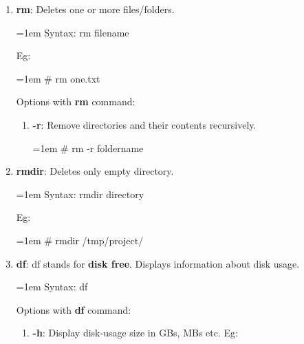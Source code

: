 \begin{flushleft}
\begin{enumerate}
		\item \textbf{rm}: Deletes one or more files/folders.
		\bigskip
		\begin{tcolorbox}[breakable,notitle,boxrule=1pt,colback=pink,colframe=pink]
			\color{black}
			\font=1em
			Syntax:  rm filename
			\font=4pt
		\end{tcolorbox}
		Eg:
		\begin{tcolorbox}[breakable,notitle,boxrule=-0pt,colback=black,colframe=black]
			\color{green}
			\font=1em
			\# rm one.txt
			\font=4pt
		\end{tcolorbox}
		Options with \textbf{rm} command:
		\begin{enumerate}[label=(\alph*)]
			\item \textbf{-r}: Remove directories and their contents recursively.
			\bigskip
			\begin{tcolorbox}[breakable,notitle,boxrule=-0pt,colback=black,colframe=black]
				\color{green}
				\font=1em
				\# rm -r foldername
				\font=4pt
			\end{tcolorbox}
		\end{enumerate}	
		\bigskip
		\bigskip
		\newpage
		\item \textbf{rmdir}: Deletes only empty directory.
		\bigskip
		\begin{tcolorbox}[breakable,notitle,boxrule=1pt,colback=pink,colframe=pink]
			\color{black}
			\font=1em
			Syntax:  rmdir directory
			\font=4pt
		\end{tcolorbox}
		Eg:
		\begin{tcolorbox}[breakable,notitle,boxrule=-0pt,colback=black,colframe=black]
			\color{green}
			\font=1em
			\# rmdir /tmp/project/
			\font=4pt
		\end{tcolorbox}
		\bigskip
		\bigskip
		\item \textbf{df}: df stands for \textbf{disk free}. Displays information about disk usage.
		\bigskip
		\begin{tcolorbox}[breakable,notitle,boxrule=1pt,colback=pink,colframe=pink]
			\color{black}
			\font=1em
			Syntax:  df
			\font=4pt
		\end{tcolorbox}
		Options with \textbf{df} command:
		\begin{enumerate}[label=(\alph*)]
			\item \textbf{-h}: Display disk-usage size in GBs, MBs etc.
			\newline
			Eg:
			\begin{tcolorbox}[breakable,notitle,boxrule=1pt,colback=black,colframe=black]

\end{tcolorbox}
\end{enumerate}
\end{enumerate}
\end{flushleft}
